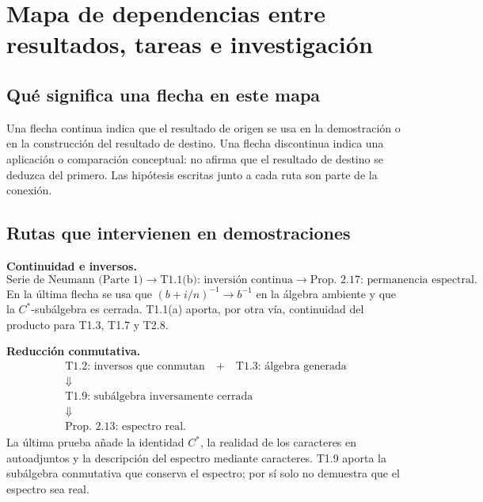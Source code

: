 \chapter{Mapa de dependencias entre resultados, tareas e investigación}

\section{Qué significa una flecha en este mapa}

\begin{context}
Una flecha continua indica que el resultado de origen se usa en la demostración o en la
construcción del resultado de destino. Una flecha discontinua indica una aplicación o comparación
conceptual: no afirma que el resultado de destino se deduzca del primero. Las hipótesis escritas
junto a cada ruta son parte de la conexión.
\end{context}

\section{Rutas que intervienen en demostraciones}

\begin{dependencias}
\textbf{Continuidad e inversos.}
\[
\boxed{\text{Serie de Neumann (Parte 1)}}
\longrightarrow
\boxed{\text{T1.1(b): inversión continua}}
\longrightarrow
\boxed{\text{Prop. 2.17: permanencia espectral}}.
\]
En la última flecha se usa que $(b+i/n)^{-1}\to b^{-1}$ en la álgebra ambiente y que la
$C^*$-subálgebra es cerrada. T1.1(a) aporta, por otra vía, continuidad del producto para T1.3,
T1.7 y T2.8.
\end{dependencias}

\begin{dependencias}
\textbf{Reducción conmutativa.}
\[
\begin{gathered}
\boxed{\text{T1.2: inversos que conmutan}}
\quad+\quad
\boxed{\text{T1.3: álgebra generada}}\\[2mm]
\Downarrow\\[2mm]
\boxed{\text{T1.9: subálgebra inversamente cerrada}}\\[2mm]
\Downarrow\\[2mm]
\boxed{\text{Prop. 2.13: espectro real}}.
\end{gathered}
\]
La última prueba añade la identidad $C^*$, la realidad de los caracteres en autoadjuntos y la
descripción del espectro mediante caracteres. T1.9 aporta la subálgebra conmutativa que conserva
el espectro; por sí solo no demuestra que el espectro sea real.
\end{dependencias}

